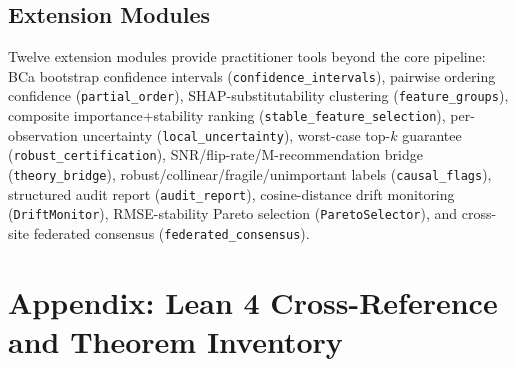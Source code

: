 \documentclass[11pt,a4paper]{article}
\begin{document}
\subsection{Extension Modules}

Twelve extension modules provide practitioner tools beyond the core pipeline: BCa bootstrap confidence intervals (\texttt{confidence\_intervals}), pairwise ordering confidence (\texttt{partial\_order}), SHAP-substitutability clustering (\texttt{feature\_groups}), composite importance+stability ranking (\texttt{stable\_feature\_selection}), per-observation uncertainty (\texttt{local\_uncertainty}), worst-case top-$k$ guarantee (\texttt{robust\_certification}), SNR/flip-rate/M-recommendation bridge (\texttt{theory\_bridge}), robust/collinear/fragile/unimportant labels (\texttt{causal\_flags}), structured audit report (\texttt{audit\_report}), cosine-distance drift monitoring (\texttt{DriftMonitor}), RMSE-stability Pareto selection (\texttt{ParetoSelector}), and cross-site federated consensus (\texttt{federated\_consensus}).

\newpage
\section*{Appendix: Lean 4 Cross-Reference and Theorem Inventory}



\end{document}
